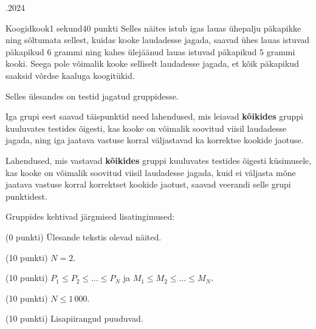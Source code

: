 \documentclass[a4paper,11pt]{article}
\begin{document}
\begin{ol}{\eio}{.2024}{\yle}{}
\begin{yl}{4}{Koogid}{kook}{1 sekund}{40 punkti}
    Selles näites istub igas lauas ühepalju päkapikke ning sõltumata sellest, kuidas kooke laudadesse jagada, saavad ühes lauas istuvad päkapikud $6$ grammi ning kahes ülejäänud lauas istuvad päkapikud $5$ grammi kooki. Seega pole võimalik kooke  selliselt laudadesse jagada, et kõik päkapikud saaksid võrdse kaaluga koogitükid.

    \nde[2]{5cm}{3cm}

    \clearpage
    
    \hnd Selles ülesandes on testid jagatud gruppidesse.

    Iga grupi eest saavad täispunktid need lahendused, mis leiavad \textbf{kõikides} gruppi kuuluvates testides õigesti, kas kooke on võimalik soovitud viisil laudadesse jagada, ning iga jaatava vastuse korral väljastavad ka korrektse kookide jaotuse.

    Lahendused, mis vastavad \textbf{kõikides} gruppi kuuluvates testides õigesti küsimusele, kas kooke on võimalik soovitud viisil laudadesse jagada, kuid ei väljasta mõne jaatava vastuse korral korrektset kookide jaotust, saavad veerandi selle grupi punktidest.

    Gruppides kehtivad järgmised lisatingimused:

    \begin{xenum}
    \item (0 punkti) Ülesande tekstis olevad näited.
    \item (10 punkti) $N = 2$.
    \item (10 punkti) $P_1 \le P_2 \le \ldots \le P_N$ ja $M_1 \le M_2 \le \ldots \le M_N$.
    \item (10 punkti) $N \le 1\,000$.
    \item (10 punkti) Lisapiirangud puuduvad.
    \end{xenum}
  \end{yl}
\end{ol}
\end{document}
